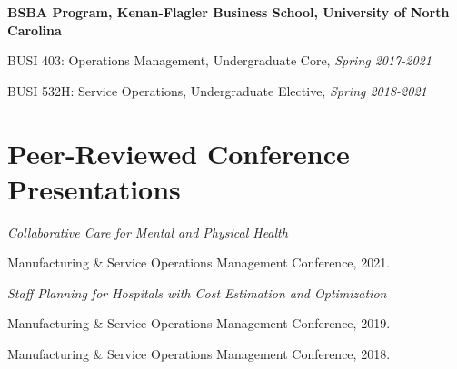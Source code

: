 \documentclass[11pt,a4paper]{article}
\renewenvironment{itemize}{
	\begin{list}{}{
			\setlength{\leftmargin}{1.5em}
		}
	}{
\end{list}
}
\begin{document}
	\begin{itemize}
		\item\textbf{ BSBA Program, Kenan-Flagler Business School, University of North
			Carolina}
		\begin{itemize}
			\item BUSI 403: Operations Management, Undergraduate Core, \emph{Spring 2017-2021 }

%


			\item BUSI 532H: Service Operations, Undergraduate Elective, \emph{Spring 2018-2021}
		\end{itemize}

	\end{itemize}





	\section*{\textbf{Peer-Reviewed Conference Presentations}}
	\begin{itemize}

		\item \emph{Collaborative Care for Mental and Physical Health}
			\begin{itemize}
			\item Manufacturing \& Service Operations Management Conference, 2021.
		\end{itemize}
		\item \emph{Staff Planning for Hospitals with Cost Estimation and
			Optimization}
		\begin{itemize}
			\item Manufacturing \& Service Operations Management Conference, 2019.
			\item Manufacturing \& Service Operations Management Conference, 2018.

		\end{itemize}
	\end{itemize}
\end{document}
